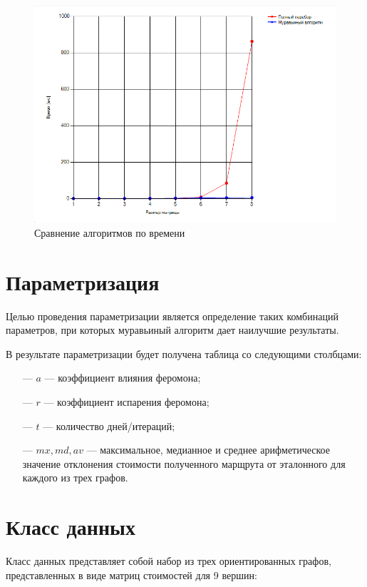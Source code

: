 \begin{figure}[h]
    \centering
    \includegraphics[width=0.8\linewidth]{img/graph-1.png}
    \caption{Сравнение алгоритмов по времени}
    \label{fig:tm}
\end{figure}

\section{Параметризация}

Целью проведения параметризации является определение таких комбинаций параметров, при которых муравьиный алгоритм дает наилучшие результаты.

В результате параметризации будет получена таблица со следующими столбцами:
\begin{itemize}
	\item[---] $a$ --- коэффициент влияния феромона;
    \item[---] $r$ --- коэффициент испарения феромона;
    \item[---] $t$ --- количество дней/итераций;
    \item[---] $mx, md, av$ --- максимальное, медианное и среднее арифметическое значение отклонения стоимости полученного марщрута от эталонного для каждого из трех графов.
\end{itemize}

\section{Класс данных}

Класс данных представляет собой набор из трех ориентированных графов, представленных в виде матриц стоимостей для 9 вершин:

